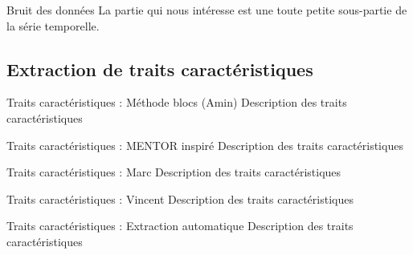 \documentclass{beamer}
\begin{document}
\begin{frame}{Bruit des données}
La partie qui nous intéresse est une toute petite sous-partie de la série temporelle.
\end{frame}

\subsection[Extraction de traits caractéristiques]{Extraction de traits caractéristiques}

\begin{frame}{Traits caractéristiques : Méthode blocs (Amin)}
Description des traits caractéristiques
\end{frame}

\begin{frame}{Traits caractéristiques : MENTOR inspiré}
Description des traits caractéristiques
\end{frame}

\begin{frame}{Traits caractéristiques : Marc}
Description des traits caractéristiques
\end{frame}

\begin{frame}{Traits caractéristiques : Vincent}
Description des traits caractéristiques
\end{frame}

\begin{frame}{Traits caractéristiques : Extraction automatique}
Description des traits caractéristiques
\end{frame}
\end{document}
